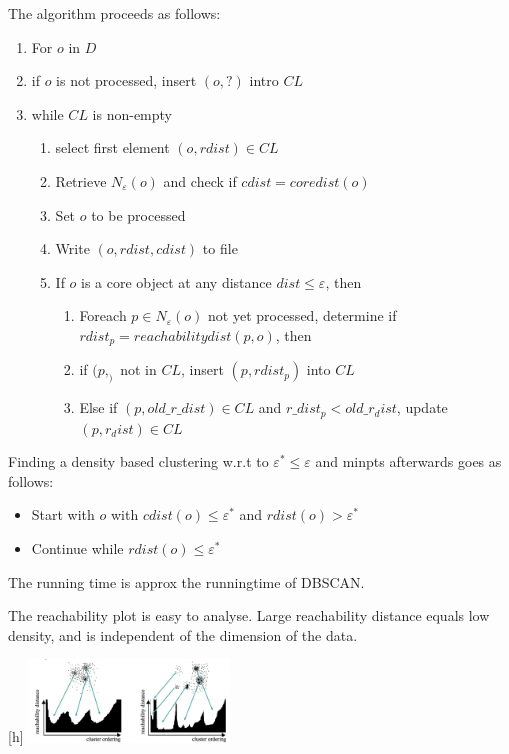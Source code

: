 The algorithm proceeds as follows:
\begin{enumerate}
    \item For $o$ in $D$
    \item if $o$ is not processed, insert $(o, ?)$ intro $CL$
    \item while $CL$ is non-empty \begin{enumerate}
        \item select first element $(o, rdist) \in CL$
        \item Retrieve $N_\varepsilon (o)$ and check if $cdist = coredist(o)$
        \item Set $o$ to be processed
        \item Write $(o, rdist, cdist)$ to file
        \item If $o$ is a core object at any distance $dist \leq \varepsilon$, then \begin{enumerate}
            \item Foreach $p \in N_{\varepsilon}(o)$ not yet processed, determine if $rdist_p = reachabilitydist(p, o)$, then
            \item if $(p, _)$ not in $CL$, insert $(p, rdist_p)$ into $CL$
            \item Else if $(p, old\_r\_dist) \in CL$ and $r\_dist_p < old\_r_dist$, update $(p, r_dist) \in CL$
        \end{enumerate}
    \end{enumerate}
\end{enumerate}

Finding a density based clustering w.r.t to $\varepsilon^* \leq \varepsilon$ and minpts afterwards goes as follows:
\begin{itemize}
    \item Start with $o$ with $cdist(o) \leq \varepsilon^*$ and $rdist(o) > \varepsilon^*$
    \item Continue while $rdist(o) \leq \varepsilon^*$
\end{itemize}

The running time is approx the runningtime of DBSCAN.

The reachability plot is easy to analyse. Large reachability distance equals low density, and is independent of the dimension of the data. 

\begin{center}[h]
    \includegraphics[width=0.4\textwidth]{images/reachabilityplot.png}
\end{center}

